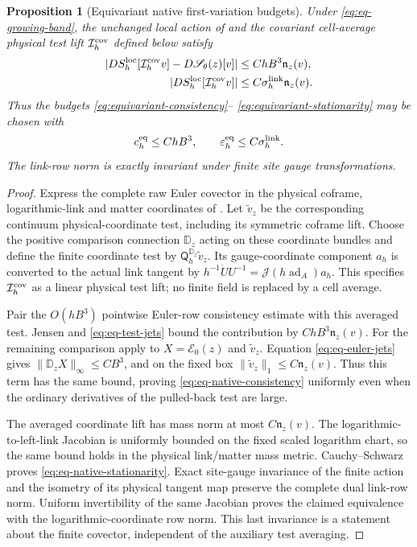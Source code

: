 \documentclass[11pt]{article}
\numberwithin{equation}{section}
\newtheorem{proposition}[proposition]{Proposition}
\theoremstyle{definition}
\theoremstyle{remark}
\newcommand{\norm}[1]{\lVert#1\rVert}
\newcommand{\abs}[1]{\lvert#1\rvert}
\newcommand{\Sact}{\mathscr S}
\begin{document}
\begin{proposition}[Equivariant native first-variation budgets]
\label{prop:equivariant-native-budgets}
Under \eqref{eq:eq-growing-band}, the unchanged local action of
 and the covariant cell-average physical test lift
$\mathcal I_h^{\rm cov}$ defined below satisfy
\begin{align}
 \abs{D S_h^{\rm loc}[\mathcal I_h^{\rm cov}v]
      -D\Sact_\theta(z)[v]}
 &\le ChB^3\mathfrak n_z(v),
 \label{eq:eq-native-consistency}\\
 \abs{D S_h^{\rm loc}[\mathcal I_h^{\rm cov}v]}
 &\le C\sigma_h^{\rm link}\mathfrak n_z(v).
 \label{eq:eq-native-stationarity}
\end{align}
Thus the budgets \eqref{eq:equivariant-consistency}--
\eqref{eq:equivariant-stationarity} may be chosen with
\begin{equation}
 c_h^{\rm eq}\le ChB^3,
 \qquad
 \varepsilon_h^{\rm eq}\le C\sigma_h^{\rm link}.
 \label{eq:eq-native-budgets}
\end{equation}
The link-row norm is exactly invariant under finite site gauge transformations.
\end{proposition}
\begin{proof}
Express the complete raw Euler covector in the physical coframe,
logarithmic-link and matter coordinates of .
Let $\widetilde v_z$ be the corresponding continuum physical-coordinate
test, including its symmetric coframe lift.  Choose the positive comparison
connection $\mathbb D_z$ acting on these coordinate bundles and define the
finite coordinate test by $\mathsf Q_h^{\mathbb D_z}\widetilde v_z$.
Its gauge-coordinate component $a_h$ is converted to the actual link tangent
by $h^{-1}\dot U U^{-1}=\mathcal J(h\operatorname{ad}_A)a_h$.
This specifies $\mathcal I_h^{\rm cov}$ as a linear physical test lift;
no finite field is replaced by a cell average.

Pair the $O(hB^3)$ pointwise Euler-row consistency estimate with this
averaged test.  Jensen and \eqref{eq:eq-test-jets} bound the contribution
by $ChB^3\mathfrak n_z(v)$.  For the remaining comparison apply
 to $X=\mathcal E_0(z)$ and
$\widetilde v_z$.  Equation \eqref{eq:eq-euler-jets} gives
$\norm{\mathbb D_z X}_\infty\le CB^3$, and on the fixed box
$\norm{\widetilde v_z}_1\le C\mathfrak n_z(v)$.  Thus this term has the
same bound, proving \eqref{eq:eq-native-consistency} uniformly even when
the ordinary derivatives of the pulled-back test are large.

The averaged coordinate lift has mass norm at most $C\mathfrak n_z(v)$.
The logarithmic-to-left-link Jacobian is uniformly bounded on the fixed
scaled logarithm chart, so the same bound holds in the physical link/matter
mass metric.  Cauchy--Schwarz proves \eqref{eq:eq-native-stationarity}.
Exact site-gauge invariance of the finite action and the isometry of its
physical tangent map preserve the complete dual link-row norm.
Uniform invertibility of the same Jacobian proves the claimed equivalence
with the logarithmic-coordinate row norm.  This last invariance is a
statement about the finite covector, independent of the auxiliary test
averaging.
\end{proof}
\end{document}
